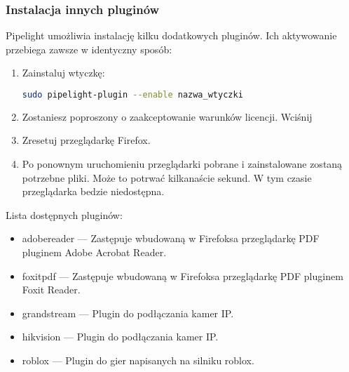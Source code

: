 \subsubsection{Instalacja innych pluginów}
\noindent Pipelight umożliwia instalację kilku dodatkowych pluginów. Ich aktywowanie przebiega zawsze w identyczny sposób:
\begin{enumerate}
\item Zainstaluj wtyczkę:
\begin{lstlisting}[language=bash]
sudo pipelight-plugin --enable nazwa_wtyczki
\end{lstlisting}
\item Zostaniesz poproszony o zaakceptowanie warunków licencji. Wciśnij 
\item Zresetuj przeglądarkę Firefox.
\item Po ponownym uruchomieniu przeglądarki pobrane i zainstalowane zostaną potrzebne pliki. Może to potrwać kilkanaście sekund. W tym czasie przeglądarka bedzie niedostępna.
\end{enumerate}
Lista dostępnych pluginów:
\begin{itemize}
\item \textcolor{ubuntu_orange}{adobereader} --- Zastępuje wbudowaną w Firefoksa przeglądarkę PDF pluginem Adobe Acrobat Reader.
\item \textcolor{ubuntu_orange}{foxitpdf} --- Zastępuje wbudowaną w Firefoksa przeglądarkę PDF pluginem Foxit Reader.
\item \textcolor{ubuntu_orange}{grandstream} --- Plugin do podłączania kamer IP.
\item \textcolor{ubuntu_orange}{hikvision} --- Plugin do podłączania kamer IP.
\item \textcolor{ubuntu_orange}{roblox} --- Plugin do gier napisanych na silniku roblox.
\end{itemize}

